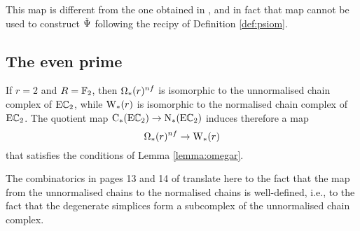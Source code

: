 This map is different from the one obtained in \cite[Prop.~6.16]{brumfiel2023explicit}, and in fact that map cannot be used to construct $\operatorname{\check{\Psi}}$ following the recipy of Definition \ref{def:psiom}.


\subsection{The even prime}\label{ss:even} If $r= 2$ and $R=\mathbb{F}_2$, then $\Omega_*(r)^{nf}$ is isomorphic to the unnormalised chain complex of $\mathrm{E}\mathbb{C}_2$, while $\operatorname{W}_{*}(r)$ is isomorphic to the normalised chain complex of $\mathrm{E}\mathbb{C}_2$. The quotient map $\operatorname{C}_{*}(\mathrm{E}\mathbb{C}_2)\to \operatorname{N}_{*}(\mathrm{E}\mathbb{C}_2)$ induces therefore a map
\[
\Omega_*(r)^{nf}\to \operatorname{W}_{*}(r)
\]
that satisfies the conditions of Lemma \ref{lemma:omegar}.
\begin{remark}
	The combinatorics in pages 13 and 14 of \cite{medina2021fast_sq} translate here to the fact that the map from the unnormalised chains to the normalised chains is well-defined, i.e., to the fact that the degenerate simplices form a subcomplex of the unnormalised chain complex.
\end{remark}